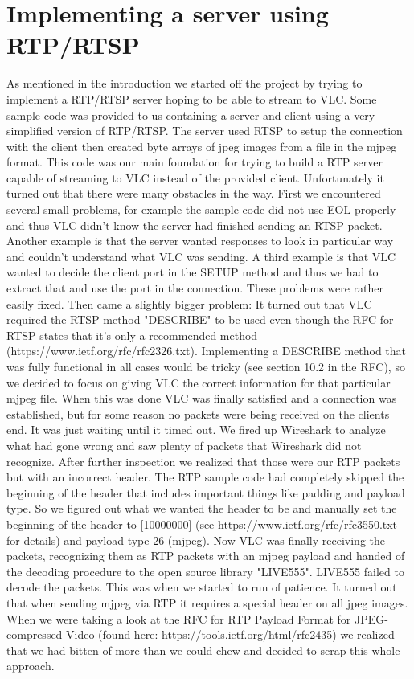 \documentclass[a4paper]{article}
\begin{document}
\section{Implementing a server using RTP/RTSP}
As mentioned in the introduction we started off the project by trying to implement a RTP/RTSP server hoping to be able to stream to VLC. 
Some sample code was provided to us containing a server and client using a very simplified version of RTP/RTSP. The server used RTSP to setup the connection with the client then created byte arrays of jpeg images from a file in the mjpeg format.
This code was our main foundation for trying to build a RTP server capable of streaming to VLC instead of the provided client. Unfortunately it turned out that there were many obstacles in the way.
First we encountered several small problems, for example the sample code did not use EOL properly and thus VLC didn't know the server had finished sending an RTSP packet. Another example is that the server wanted responses to look in particular way and couldn't understand what VLC was sending.
A third example is that VLC wanted to decide the client port in the SETUP method and thus we had to extract that and use the port in the connection.
These problems were rather easily fixed. Then came a slightly bigger problem: It turned out that VLC required the RTSP method "DESCRIBE" to be used even though the RFC for RTSP states that it's only a recommended method  (https://www.ietf.org/rfc/rfc2326.txt).
Implementing a DESCRIBE method that was fully functional in all cases would be tricky (see section 10.2 in the RFC), so we decided to focus on giving VLC the correct information for that particular mjpeg file. 
When this was done VLC was finally satisfied and a connection was established, but for some reason no packets were being received on the clients end. It was just waiting until it timed out.
We fired up Wireshark to analyze what had gone wrong and saw plenty of packets that Wireshark did not recognize. After further inspection we realized that those were our RTP packets but with an incorrect header.
The RTP sample code had completely skipped the beginning of the header that includes important things like padding and payload type. So we figured out what we wanted the header to be and manually set the beginning of the header to [10000000] (see https://www.ietf.org/rfc/rfc3550.txt for details) and payload type 26 (mjpeg).
Now VLC was finally receiving the packets, recognizing them as RTP packets with an mjpeg payload and handed of the decoding procedure to the open source library "LIVE555".
LIVE555 failed to decode the packets. This was when we started to run of patience. It turned out that when sending mjpeg via RTP it requires a special header on all jpeg images. 
When we were taking a look at the RFC for RTP Payload Format for JPEG-compressed Video (found here: https://tools.ietf.org/html/rfc2435) we realized that we had bitten of more than we could chew and decided to scrap this whole approach.
\end{document}
